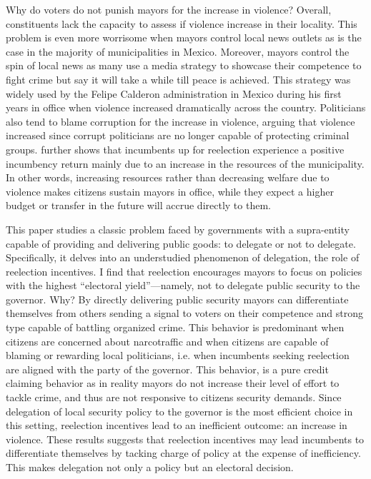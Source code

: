 \documentclass[12pt]{amsart}
\makeatletter
\def\section{\@startsection{section}{1}
	\z@{1.0\linespacing\@plus\linespacing}{.5\linespacing}{\Large}}
\numberwithin{equation}{section}
\theoremstyle{definition}
\theoremstyle{definition}
\theoremstyle{definition}
\makeatother
\begin{document}
Why do voters do not punish mayors for the increase in violence? Overall, constituents lack the capacity to assess if violence increase in their locality. This problem is even more worrisome when mayors control local news outlets as is the case in the majority of municipalities in Mexico. Moreover, mayors control the spin of local news as many use a media strategy to showcase their competence to fight crime but say it will take a while till peace is achieved. This strategy was widely used by the Felipe Calderon administration in Mexico during his first years in office when violence increased dramatically across the country. Politicians also tend to blame corruption for the increase in violence, arguing that violence increased since corrupt politicians are no longer capable of protecting criminal groups. \citet{ch_2021} further shows that incumbents up for reelection experience a positive incumbency return mainly due to an increase in the resources of the municipality. In other words, increasing resources rather than decreasing welfare due to violence makes citizens sustain mayors in office, while they expect a higher budget or transfer in the future will accrue directly to them. 

\section{Conclusion \label{sec:conclusion}}

This paper studies a classic problem faced by governments with a supra-entity capable of providing and delivering public goods: to delegate or not to delegate. Specifically, it delves into an understudied phenomenon of delegation, the role of reelection incentives. I find that reelection encourages mayors to focus on policies with the highest “electoral yield”—namely, not to delegate public security to the governor. Why? By directly delivering public security mayors can differentiate themselves from others sending a signal to voters on their competence and strong type capable of battling organized crime.  This behavior is predominant when citizens are concerned about narcotraffic and when citizens are capable of blaming or rewarding local politicians, i.e. when incumbents seeking reelection are aligned with the party of the governor. This behavior, is a pure credit claiming behavior as in reality mayors do not increase their level of effort to tackle crime, and thus are not responsive to citizens security demands. Since delegation of local security policy to the governor is the most efficient choice in this setting, reelection incentives lead to an inefficient outcome: an increase in violence. These results suggests that reelection incentives may lead incumbents to differentiate themselves by tacking charge of policy at the expense of inefficiency. This makes delegation not only a policy but an electoral decision. 
\end{document}
